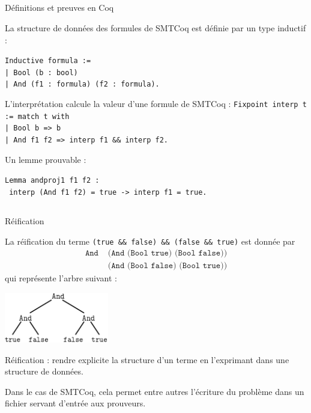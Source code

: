 \documentclass{beamer}
\begin{document}
    \subsection{}
    \begin{frame}{Définitions et preuves en Coq}

      La structure de données des formules de SMTCoq est définie par un type inductif :

      \texttt{Inductive formula := }\\
      \texttt{| Bool (b\,:\,bool)}\\
      \texttt{| And (f1\,:\,formula) (f2\,:\,formula).}

      \vspace{0.5cm}
      L'interprétation calcule la valeur d'une formule de SMTCoq :
      \texttt{Fixpoint interp t := match t with}\\
      \texttt{| Bool b => b}\\
      \texttt{| And f1 f2 => interp f1 \&\& interp f2.}

      \vspace{0.5cm}
      Un lemme prouvable :

      \texttt{Lemma andproj1 f1 f2 : }\\
      \texttt{  interp (And f1 f2) = true -> interp f1 = true.}


    \end{frame}

    \subsection{}
    \begin{frame}{Réification}

      La réification du terme  \texttt{(true\,\&\&\,false)\,\&\&\,(false\,\&\&\,true)}
      est donnée par
      \begin{align*}
        \texttt{And }  &\texttt{(And (Bool true) (Bool false))}\\
        &\texttt{(And (Bool false) (Bool true))}
      \end{align*}
      qui représente l'arbre suivant :
      \begin{center}
        \includegraphics[height=2.2cm]{booltree.pdf}
      \end{center}

      Réification : rendre explicite la structure d'un terme en l'exprimant dans une structure de données.


      \vspace{2mm}

      Dans le cas de SMTCoq, cela permet entre autres l'écriture du problème dans un fichier servant d'entrée aux prouveurs.
    \end{frame}
\end{document}
